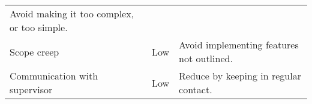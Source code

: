 \begin{longtable}[]{@{}lll@{}}
\begin{minipage}[t]{0.50\columnwidth}
Avoid making it too complex, or too simple.\strut
\end{minipage}\tabularnewline
\begin{minipage}[t]{0.28\columnwidth}\raggedright\strut
Scope creep\strut
\end{minipage} & \begin{minipage}[t]{0.13\columnwidth}\raggedright\strut
Low\strut
\end{minipage} & \begin{minipage}[t]{0.50\columnwidth}\raggedright\strut
Avoid implementing features not outlined.\strut
\end{minipage}\tabularnewline
\begin{minipage}[t]{0.28\columnwidth}\raggedright\strut
Communication with supervisor\strut
\end{minipage} & \begin{minipage}[t]{0.13\columnwidth}\raggedright\strut
Low\strut
\end{minipage} & \begin{minipage}[t]{0.50\columnwidth}\raggedright\strut
Reduce by keeping in regular contact.\strut
\end{minipage}\tabularnewline
\bottomrule
\end{longtable}
